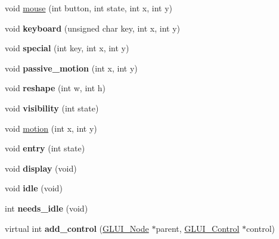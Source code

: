 \begin{DoxyCompactItemize}
\item 
void \hyperlink{classGLUI__Main_a4fb7819317131b79a65eeb414ab4e43b}{mouse} (int button, int state, int x, int y)
\item 
\hypertarget{classGLUI__Main_a054900a1fe81ede8c3834a364120ef2a}{void {\bfseries keyboard} (unsigned char key, int x, int y)}\label{classGLUI__Main_a054900a1fe81ede8c3834a364120ef2a}

\item 
\hypertarget{classGLUI__Main_ae3dbd97f2fbf58708383a2d167a1841c}{void {\bfseries special} (int key, int x, int y)}\label{classGLUI__Main_ae3dbd97f2fbf58708383a2d167a1841c}

\item 
\hypertarget{classGLUI__Main_a9b36f32a0d9b5fa302ddf38be67391ab}{void {\bfseries passive\-\_\-motion} (int x, int y)}\label{classGLUI__Main_a9b36f32a0d9b5fa302ddf38be67391ab}

\item 
\hypertarget{classGLUI__Main_a392acf9047e2be2582a1635f8fb6ff23}{void {\bfseries reshape} (int w, int h)}\label{classGLUI__Main_a392acf9047e2be2582a1635f8fb6ff23}

\item 
\hypertarget{classGLUI__Main_a776f5d5aa6323af0c05992c83be90bbf}{void {\bfseries visibility} (int state)}\label{classGLUI__Main_a776f5d5aa6323af0c05992c83be90bbf}

\item 
void \hyperlink{classGLUI__Main_a0e8746ccbea45d443007854ae3e07c53}{motion} (int x, int y)
\item 
\hypertarget{classGLUI__Main_a5e7e1594748809fb14ac86f3d15fc5a0}{void {\bfseries entry} (int state)}\label{classGLUI__Main_a5e7e1594748809fb14ac86f3d15fc5a0}

\item 
\hypertarget{classGLUI__Main_af8867df3fa133efbf11064da84a8c047}{void {\bfseries display} (void)}\label{classGLUI__Main_af8867df3fa133efbf11064da84a8c047}

\item 
\hypertarget{classGLUI__Main_a0f172148e78cde1d8e25e989ba90d43d}{void {\bfseries idle} (void)}\label{classGLUI__Main_a0f172148e78cde1d8e25e989ba90d43d}

\item 
\hypertarget{classGLUI__Main_aef95c5469e82e69335293fecbebdd3ab}{int {\bfseries needs\-\_\-idle} (void)}\label{classGLUI__Main_aef95c5469e82e69335293fecbebdd3ab}

\item 
\hypertarget{classGLUI__Main_a63be4fb40e0ef3fe20f833ea38df2ecb}{virtual int {\bfseries add\-\_\-control} (\hyperlink{classGLUI__Node}{G\-L\-U\-I\-\_\-\-Node} $\ast$parent, \hyperlink{classGLUI__Control}{G\-L\-U\-I\-\_\-\-Control} $\ast$control)}\label{classGLUI__Main_a63be4fb40e0ef3fe20f833ea38df2ecb}

\end{DoxyCompactItemize}
